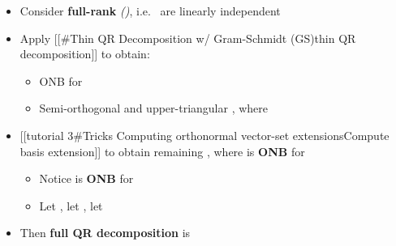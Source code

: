 \begin{itemize}

  \item
        Consider \textbf{full-rank}
        \emph{()},
        i.e.~
        are linearly independent
  \item
        Apply {[}{[}\#Thin QR Decomposition w/ Gram-Schmidt (GS)\textbar thin
        QR decomposition{]}{]} to obtain:

        \begin{itemize}

          \item
                ONB
                for 
          \item
                Semi-orthogonal
                and upper-triangular ,
                where 
        \end{itemize}
  \item
        {[}{[}tutorial 3\#Tricks Computing orthonormal vector-set
        extensions\textbar Compute basis extension{]}{]} to obtain remaining
        ,
        where 
        is \textbf{ONB} for 

        \begin{itemize}

          \item
                Notice
                 is
                \textbf{ONB} for 
          \item
                Let
                ,
                let , let
        \end{itemize}
  \item
        Then \textbf{full QR decomposition} is


\end{itemize}
